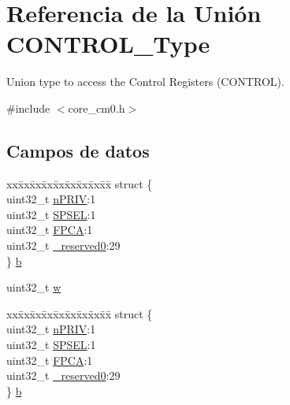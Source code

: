 \hypertarget{union_c_o_n_t_r_o_l___type}{}\section{Referencia de la Unión C\+O\+N\+T\+R\+O\+L\+\_\+\+Type}
\label{union_c_o_n_t_r_o_l___type}


Union type to access the Control Registers (C\+O\+N\+T\+R\+OL).  




{\ttfamily \#include $<$core\+\_\+cm0.\+h$>$}

\subsection*{Campos de datos}
\begin{DoxyCompactItemize}
\item 
\begin{tabbing}
xx\=xx\=xx\=xx\=xx\=xx\=xx\=xx\=xx\=\kill
struct \{\\
\>uint32\_t \hyperlink{union_c_o_n_t_r_o_l___type_a2a6e513e8a6bf4e58db169e312172332}{nPRIV}:1\\
\>uint32\_t \hyperlink{union_c_o_n_t_r_o_l___type_ae185aac93686ffc78e998a9daf41415b}{SPSEL}:1\\
\>uint32\_t \hyperlink{union_c_o_n_t_r_o_l___type_a2518558c090f60161ba4e718a54ee468}{FPCA}:1\\
\>uint32\_t \hyperlink{union_c_o_n_t_r_o_l___type_ac8a6a13838a897c8d0b8bc991bbaf7c1}{\_reserved0}:29\\
\} \hyperlink{union_c_o_n_t_r_o_l___type_ab2a41711c248a319c2e7d0ab73c3a8b9}{b}\\

\end{tabbing}\item 
uint32\+\_\+t \hyperlink{union_c_o_n_t_r_o_l___type_ad0fb62e7a08e70fc5e0a76b67809f84b}{w}
\item 
\begin{tabbing}
xx\=xx\=xx\=xx\=xx\=xx\=xx\=xx\=xx\=\kill
struct \{\\
\>uint32\_t \hyperlink{union_c_o_n_t_r_o_l___type_a2a6e513e8a6bf4e58db169e312172332}{nPRIV}:1\\
\>uint32\_t \hyperlink{union_c_o_n_t_r_o_l___type_ae185aac93686ffc78e998a9daf41415b}{SPSEL}:1\\
\>uint32\_t \hyperlink{union_c_o_n_t_r_o_l___type_a2518558c090f60161ba4e718a54ee468}{FPCA}:1\\
\>uint32\_t \hyperlink{union_c_o_n_t_r_o_l___type_ac8a6a13838a897c8d0b8bc991bbaf7c1}{\_reserved0}:29\\
\} \hyperlink{union_c_o_n_t_r_o_l___type_a362f58ce033c684dddd5ae69c5417ef5}{b}\\


\end{tabbing}
\end{DoxyCompactItemize}
